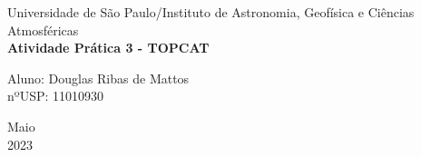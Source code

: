 \documentclass[a4paper, 12pt]{article}
\begin{document}
	
	\begin{titlepage}
		\begin{center}
			
			
			\Huge{Universidade de São Paulo/Instituto de Astronomia, Geofísica e Ciências Atmosféricas}\\
			\vspace{15pt}
			\vspace{95pt}
			\textbf{\LARGE{Atividade Prática 3 - TOPCAT}}\\
			\vspace{3,5cm}
		\end{center}
		
		\begin{flushleft}
			\begin{tabbing}
				Aluno: Douglas Ribas de Mattos\\
				nºUSP: 11010930\\
			\end{tabbing}
		\end{flushleft}
		\vspace{1cm}
		
		\begin{center}
			\vspace{\fill}
			Maio\\
			2023
		\end{center}
	\end{titlepage}
	
	
\end{document}
